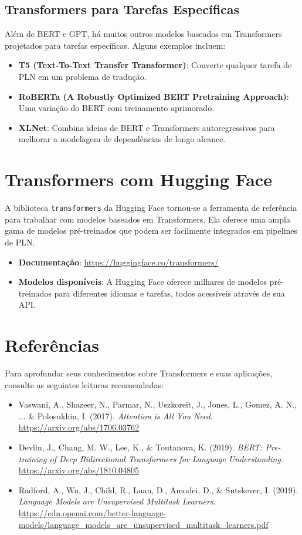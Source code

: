 \documentclass[14pt,a4paper,oneside]{book}
\begin{document}
\subsection{Transformers para Tarefas Específicas}

Além de BERT e GPT, há muitos outros modelos baseados em Transformers projetados para tarefas específicas. Alguns exemplos incluem:

\begin{itemize}
	\item \textbf{T5 (Text-To-Text Transfer Transformer)}: Converte qualquer tarefa de PLN em um problema de tradução.
	\item \textbf{RoBERTa (A Robustly Optimized BERT Pretraining Approach)}: Uma variação do BERT com treinamento aprimorado.
	\item \textbf{XLNet}: Combina ideias de BERT e Transformers autoregressivos para melhorar a modelagem de dependências de longo alcance.
\end{itemize}

\section{Transformers com Hugging Face}

A biblioteca \texttt{transformers} da Hugging Face tornou-se a ferramenta de referência para trabalhar com modelos baseados em Transformers. Ela oferece uma ampla gama de modelos pré-treinados que podem ser facilmente integrados em pipelines de PLN.

\begin{itemize}
	\item \textbf{Documentação}: \url{https://huggingface.co/transformers/}
	\item \textbf{Modelos disponíveis}: A Hugging Face oferece milhares de modelos pré-treinados para diferentes idiomas e tarefas, todos acessíveis através de sua API.
\end{itemize}

\section{Referências}

Para aprofundar seus conhecimentos sobre Transformers e suas aplicações, consulte as seguintes leituras recomendadas:

\begin{itemize}
	\item Vaswani, A., Shazeer, N., Parmar, N., Uszkoreit, J., Jones, L., Gomez, A. N., ... \& Polosukhin, I. (2017). \textit{Attention is All You Need}. \url{https://arxiv.org/abs/1706.03762}
	\item Devlin, J., Chang, M. W., Lee, K., \& Toutanova, K. (2019). \textit{BERT: Pre-training of Deep Bidirectional Transformers for Language Understanding}. \url{https://arxiv.org/abs/1810.04805}
	\item Radford, A., Wu, J., Child, R., Luan, D., Amodei, D., \& Sutskever, I. (2019). \textit{Language Models are Unsupervised Multitask Learners}. \url{https://cdn.openai.com/better-language-models/language_models_are_unsupervised_multitask_learners.pdf}
\end{itemize}
\end{document}
